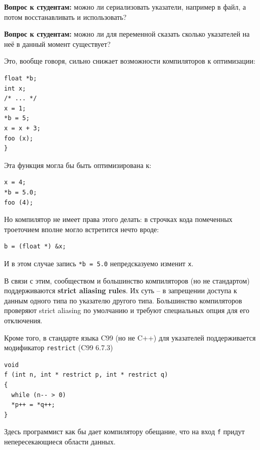 \documentclass[a4paper,12pt,oneside]{article}
\newif\ifanswers
\begin{document}
\textbf{Вопрос к студентам:} можно ли сериализовать указатели, например в файл, а потом восстанавливать и использовать?

\ifanswers
Ответ: да, в течении срока жизни того, на что они указывают.
\fi

\textbf{Вопрос к студентам:} можно ли для переменной сказать сколько указателей на неё в данный момент существует?

\ifanswers
Ответ: увы, нет. Никакая переменная не ``знает'' о том, что кто-то взял её адрес и т.п.
\fi

Это, вообще говоря, сильно снижает возможности компиляторов к оптимизации:

\begin{lstlisting}
float *b; 
int x;
/* ... */
x = 1;
*b = 5;
x = x + 3;
foo (x);
}
\end{lstlisting}

Эта функция могла бы быть оптимизирована к:

\begin{lstlisting}
x = 4;
*b = 5.0;
foo (4);
\end{lstlisting}

Но компилятор не имеет права этого делать: в строчках кода помеченных троеточием вполне могло встретится нечто вроде:

\begin{lstlisting}
b = (float *) &x;
\end{lstlisting}

И в этом случае запись \lstinline!*b = 5.0! непредсказуемо изменит \lstinline!x!.

В связи с этим, сообществом и большинство компиляторов (но не стандартом) поддерживаются \textbf{strict aliasing rules}\label{StrictAliasing}. Их суть -- в запрещении доступа к данным одного типа по указателю другого типа. Большинство компиляторов проверяют strict aliasing по умолчанию и требуют специальных опция для его отключения.

Кроме того, в стандарте языка C99 (но не C++) для указателей поддерживается модификатор \lstinline!restrict! (C99 6.7.3)

\begin{lstlisting}
void 
f (int n, int * restrict p, int * restrict q)
{
  while (n-- > 0)
  *p++ = *q++;
}
\end{lstlisting}

Здесь программист как бы дает компилятору обещание, что на вход \lstinline!f! придут непересекающиеся области данных.
\end{document}
